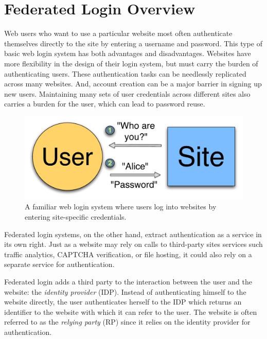 \documentclass{llncs}
\begin{document}
\section{Federated Login Overview}
\label{sec:fedlogin}

Web users who want to use a particular website most often authenticate
themselves directly to the site by entering a username and
password. This type of basic web login system has both advantages and
disadvantages. Websites have more flexibility in the design of their
login system, but must carry the burden of authenticating users. These
authentication tasks can be needlessly replicated across many
websites. And, account creation can be a major barrier in signing up new
users. Maintaining many sets of user credentials across different sites also
carries a burden for the user, which can lead to password reuse.



\begin{figure}
  \centering
  \includegraphics[scale=0.5]{figs/fig-passwd-color.pdf}
  \caption{A familiar web login system where users log into websites
    by entering site-specific credentials.}
  \label{fig:passwd}
\end{figure}

Federated login systems, on the other hand, extract authentication as
a service in its own right. Just as a website may rely on calls to
third-party sites services such traffic analytics, CAPTCHA
verification, or file hosting, it could also rely on a separate
service for authentication.

Federated login adds a third party to the interaction between the user
and the website: the \emph{identity provider} (IDP). Instead of
authenticating himself to the website directly, the user authenticates
herself to the IDP which returns an identifier to the website with
which it can refer to the user. The website is often referred to as
the \emph{relying party} (RP) since it relies on the identity provider
for authentication.
\end{document}
